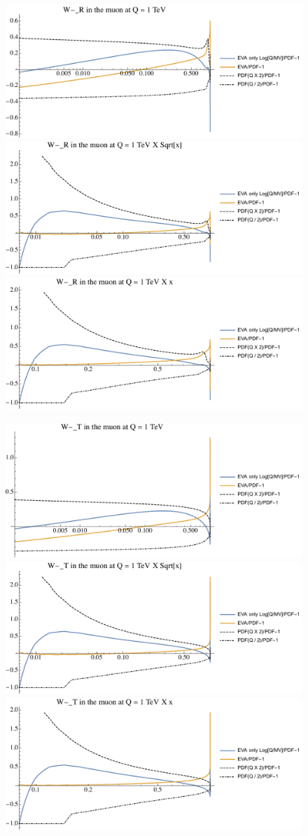 \documentclass[a4paper,11pt]{article}
\begin{document}
\begin{figure}[ht]
\includegraphics[width=0.46\linewidth]{PlotPDFs/ratios/1TeV/W-_R_Q.pdf}
\includegraphics[width=0.46\linewidth]{PlotPDFs/ratios/1TeV/W-_R_Qsqrtx.pdf}
\includegraphics[width=0.46\linewidth]{PlotPDFs/ratios/1TeV/W-_R_Qx.pdf}
\end{figure}

\begin{figure}[ht]
\includegraphics[width=0.46\linewidth]{PlotPDFs/ratios/1TeV/W-_T_Q.pdf}
\includegraphics[width=0.46\linewidth]{PlotPDFs/ratios/1TeV/W-_T_Qsqrtx.pdf}
\includegraphics[width=0.46\linewidth]{PlotPDFs/ratios/1TeV/W-_T_Qx.pdf}
\end{figure}
\end{document}
